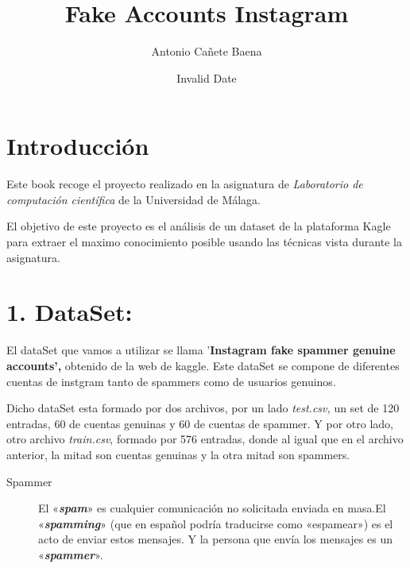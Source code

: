 \documentclass[
  letterpaper,
  DIV=11,
  numbers=noendperiod]{scrreprt}
\title{Fake Accounts Instagram}
\author{Antonio Cañete Baena}
\date{Invalid Date}
\renewcommand*\contentsname{Table of contents}
\newcommand\contentsname{Table of contents}
\begin{document}
\maketitle

\renewcommand*\contentsname{Table of contents}
{
\hypersetup{linkcolor=}
\setcounter{tocdepth}{2}
\tableofcontents
}

\chapter*{Introducción}\label{introducciuxf3n}


Este book recoge el proyecto realizado en la asignatura de
\emph{Laboratorio de computación científica} de la Universidad de
Málaga.

El objetivo de este proyecto es el análisis de un dataset de la
plataforma Kagle para extraer el maximo conocimiento posible usando las
técnicas vista durante la asignatura.


\chapter*{1. DataSet:}\label{dataset}


El dataSet que vamos a utilizar se llama '\textbf{Instagram fake spammer
genuine accounts',} obtenido de la web de kaggle. Este dataSet se
compone de diferentes cuentas de instgram tanto de spammers como de
usuarios genuinos.

Dicho dataSet esta formado por dos archivos, por un lado
\emph{test.csv,} un set de 120 entradas, 60 de cuentas genuinas y 60 de
cuentas de spammer. Y por otro lado, otro archivo \emph{train.csv},
formado por 576 entradas, donde al igual que en el archivo anterior, la
mitad son cuentas genuinas y la otra mitad son spammers.

\begin{description}
\item[Spammer]
El «\textbf{\emph{spam}}» es cualquier comunicación no solicitada
enviada en masa.El «\textbf{\emph{spamming}}» (que en español podría
traducirse como «espamear») es el acto de enviar estos mensajes. Y la
persona que envía los mensajes es un «\textbf{\emph{spammer}}».
\end{description}
\end{document}

